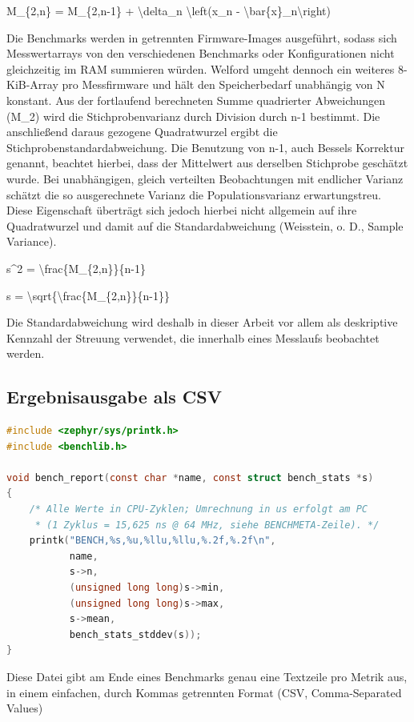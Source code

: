 M\_\{2,n\} = M\_\{2,n-1\} + \textbackslash{}delta\_n \textbackslash{}left(x\_n - \textbackslash{}bar\{x\}\_n\textbackslash{}right)

Die Benchmarks werden in getrennten Firmware-Images ausgef{\"u}hrt, sodass sich Messwertarrays von den verschiedenen Benchmarks oder Konfigurationen nicht gleichzeitig im RAM summieren w{\"u}rden. Welford umgeht dennoch ein weiteres 8-KiB-Array pro Messfirmware und h{\"a}lt den Speicherbedarf unabh{\"a}ngig von N konstant. Aus der fortlaufend berechneten Summe quadrierter Abweichungen (M\_2) wird die Stichprobenvarianz durch Division durch n-1 bestimmt. Die anschlie{\ss}end daraus gezogene Quadratwurzel ergibt die Stichprobenstandardabweichung. Die Benutzung von n-1, auch Bessels Korrektur genannt, beachtet hierbei, dass der Mittelwert aus derselben Stichprobe gesch{\"a}tzt wurde. Bei unabh{\"a}ngigen, gleich verteilten Beobachtungen mit endlicher Varianz sch{\"a}tzt die so ausgerechnete Varianz die Populationsvarianz erwartungstreu. Diese Eigenschaft {\"u}bertr{\"a}gt sich jedoch hierbei nicht allgemein auf ihre Quadratwurzel und damit auf die Standardabweichung (Weisstein, o. D., \glqq{}Sample Variance\grqq{}).

s\textasciicircum{}2 = \textbackslash{}frac\{M\_\{2,n\}\}\{n-1\}

s = \textbackslash{}sqrt\{\textbackslash{}frac\{M\_\{2,n\}\}\{n-1\}\}

Die Standardabweichung wird deshalb in dieser Arbeit vor allem als deskriptive Kennzahl der Streuung verwendet, die innerhalb eines Messlaufs beobachtet werden.


\subsection{Ergebnisausgabe als CSV}
\begin{lstlisting}[style=basecode,language=C]
#include <zephyr/sys/printk.h>
#include <benchlib.h>

void bench_report(const char *name, const struct bench_stats *s)
{
	/* Alle Werte in CPU-Zyklen; Umrechnung in us erfolgt am PC
	 * (1 Zyklus = 15,625 ns @ 64 MHz, siehe BENCHMETA-Zeile). */
	printk("BENCH,%s,%u,%llu,%llu,%.2f,%.2f\n",
	       name,
	       s->n,
	       (unsigned long long)s->min,
	       (unsigned long long)s->max,
	       s->mean,
	       bench_stats_stddev(s));
}
\end{lstlisting}
Diese Datei gibt am Ende eines Benchmarks genau eine Textzeile pro Metrik aus, in einem einfachen, durch Kommas getrennten Format (CSV, Comma-Separated Values)

